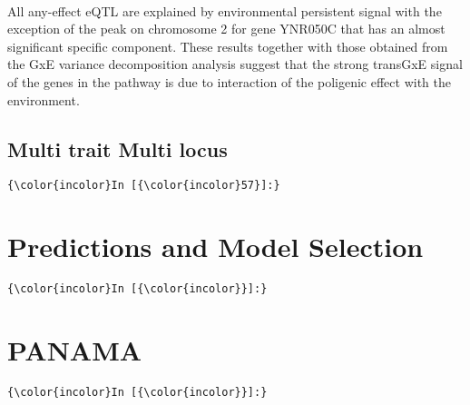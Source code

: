 \documentclass{article}
\begin{document}
    \begin{center}
    \end{center}
    { \hspace*{\fill} \\}
    
    All any-effect eQTL are explained by environmental persistent signal
with the exception of the peak on chromosome 2 for gene YNR050C that has
an almost significant specific component. These results together with
those obtained from the GxE variance decomposition analysis suggest that
the strong transGxE signal of the genes in the pathway is due to
interaction of the poligenic effect with the environment.


    \subsection{Multi trait Multi locus}


    \begin{Verbatim}[commandchars=\\\{\}]
{\color{incolor}In [{\color{incolor}57}]:} 
\end{Verbatim}


    \section{Predictions and Model Selection}


    \begin{Verbatim}[commandchars=\\\{\}]
{\color{incolor}In [{\color{incolor}}]:} 
\end{Verbatim}


    \section{PANAMA}


    \begin{Verbatim}[commandchars=\\\{\}]
{\color{incolor}In [{\color{incolor}}]:} 
\end{Verbatim}


    
    
    
    
\end{document}
